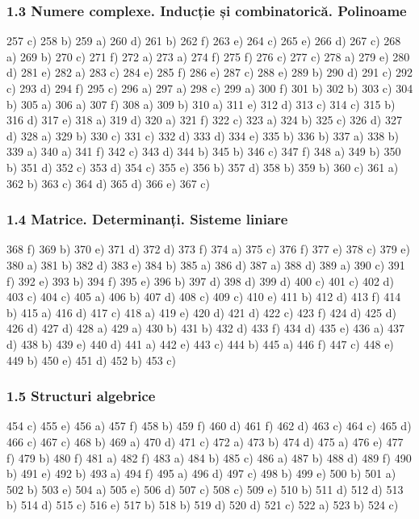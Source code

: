 \documentclass[11pt]{article}
\begin{document}
\subsubsection*{1.3 Numere complexe. Inducție și combinatorică. Polinoame}
257 c) 258 b) 259 a) 260 d) 261 b) 262 f) 263 e) 264 c) 265 e) 266 d) 267 c) 268 a) 269 b) 270 c) 271 f) 272 a) 273 a) 274 f) 275 f) 276 c) 277 c) 278 a) 279 e) 280 d) 281 e) 282 a) 283 c) 284 e) 285 f) 286 e) 287 c) 288 e) 289 b) 290 d) 291 c) 292 c) 293 d) 294 f) 295 c) 296 a) 297 a) 298 c) 299 a) 300 f) 301 b) 302 b) 303 c) 304 b) 305 a) 306 a) 307 f) 308 a) 309 b) 310 a) 311 e) 312 d) 313 c) 314 c) 315 b) 316 d) 317 e) 318 a) 319 d) 320 a) 321 f) 322 c) 323 a) 324 b) 325 c) 326 d) 327 d) 328 a) 329 b) 330 c) 331 c) 332 d) 333 d) 334 e) 335 b) 336 b) 337 a) 338 b) 339 a) 340 a) 341 f) 342 c) 343 d) 344 b) 345 b) 346 c) 347 f) 348 a) 349 b) 350 b) 351 d) 352 c) 353 d) 354 c) 355 e) 356 b) 357 d) 358 b) 359 b) 360 c) 361 a) 362 b) 363 c) 364 d) 365 d) 366 e) 367 c)

\subsubsection*{1.4 Matrice. Determinanți. Sisteme liniare}
368 f) 369 b) 370 e) 371 d) 372 d) 373 f) 374 a) 375 c) 376 f) 377 e) 378 c) 379 e) 380 a) 381 b) 382 d) 383 e) 384 b) 385 a) 386 d) 387 a) 388 d) 389 a) 390 c) 391 f) 392 e) 393 b) 394 f) 395 e) 396 b) 397 d) 398 d) 399 d) 400 c) 401 c) 402 d) 403 c) 404 c) 405 a) 406 b) 407 d) 408 c) 409 c) 410 e) 411 b) 412 d) 413 f) 414 b) 415 a) 416 d) 417 c) 418 a) 419 e) 420 d) 421 d) 422 c) 423 f) 424 d) 425 d) 426 d) 427 d) 428 a) 429 a) 430 b) 431 b) 432 d) 433 f) 434 d) 435 e) 436 a) 437 d) 438 b) 439 e) 440 d) 441 a) 442 e) 443 c) 444 b) 445 a) 446 f) 447 c) 448 e) 449 b) 450 e) 451 d) 452 b) 453 c)

\subsubsection*{1.5 Structuri algebrice}
454 c) 455 e) 456 a) 457 f) 458 b) 459 f) 460 d) 461 f) 462 d) 463 c) 464 c) 465 d) 466 c) 467 c) 468 b) 469 a) 470 d) 471 c) 472 a) 473 b) 474 d) 475 a) 476 e) 477 f) 479 b) 480 f) 481 a) 482 f) 483 a) 484 b) 485 c) 486 a) 487 b) 488 d) 489 f) 490 b) 491 e) 492 b) 493 a) 494 f) 495 a) 496 d) 497 c) 498 b) 499 e) 500 b) 501 a) 502 b) 503 e) 504 a) 505 e) 506 d) 507 c) 508 c) 509 e) 510 b) 511 d) 512 d) 513 b) 514 d) 515 c) 516 e) 517 b) 518 b) 519 d) 520 d) 521 c) 522 a) 523 b) 524 c)
\end{document}
